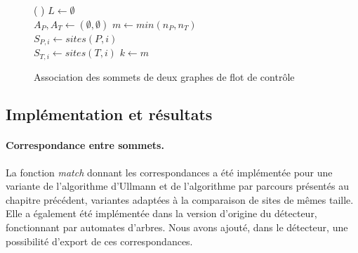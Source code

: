 \begin{figure}[h]
\begin{algorithm}[H]
\DontPrintSemicolon
\caption{Association des sommets de deux graphes de flot de contrôle}
\SetAlgoLined
{}
\Fn(
){}{
$L\leftarrow \emptyset$\\
$A_P, A_T \leftarrow (\emptyset, \emptyset)$ 
$m\leftarrow min(n_P, n_T)$\\
 {
  $S_{P, i}\leftarrow sites(P, i)$\\
  $S_{T, i}\leftarrow sites(T, i)$
}
$k\leftarrow m$\\
}
\label{algo:correspondance_fine}
\end{algorithm}
\end{figure}

\subsection{Implémentation et résultats}
\paragraph{Correspondance entre sommets.}
La fonction \emph{match} donnant les correspondances a été implémentée pour une variante de l'algorithme d'Ullmann et de l'algorithme par parcours présentés au chapitre précédent, variantes adaptées à la comparaison de sites de mêmes taille.
Elle a également été implémentée dans la version d'origine du détecteur, fonctionnant par automates d'arbres.
Nous avons ajouté, dans le détecteur, une possibilité d'export de ces correspondances.

